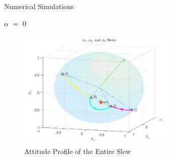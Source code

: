\documentclass{beamer}
\begin{document}
\begin{frame}{Numerical Simulations}
\begin{block}{$\alpha$ $=$ 0}
	
	\begin{figure}[H]
		\label{fig:phi1_phi2_phi3_alpha0}
		\includegraphics[width=3in]{figures/alpha0/phi1_phi2_phi3.png}
		\caption{Attitude Profile of the Entire Slew}
	\end{figure}
	
\end{block}
\end{frame}
\end{document}
